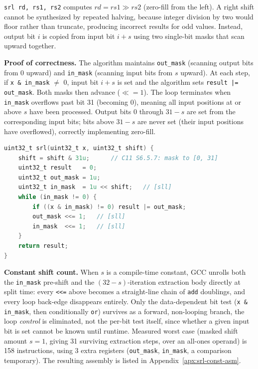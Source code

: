 \texttt{srl rd, rs1, rs2} computes $\mathit{rd} = \mathit{rs1} \gg \mathit{rs2}$ (zero-fill from
the left). A right shift cannot be synthesized by repeated halving, because integer division by two
would floor rather than truncate, producing incorrect results for odd values. Instead, output bit $i$
is copied from input bit $i + s$ using two single-bit masks that scan upward together.

\textbf{Proof of correctness.} The algorithm maintains \texttt{out\_mask} (scanning output bits from
0 upward) and \texttt{in\_mask} (scanning input bits from $s$ upward). At each step, if
\texttt{x \& in\_mask} $\neq$ 0, input bit $i+s$ is set and the algorithm sets
\texttt{result |= out\_mask}. Both masks then advance ($\ll\!\!= 1$). The loop terminates when
\texttt{in\_mask} overflows past bit 31 (becoming 0), meaning all input positions at or above $s$
have been processed. Output bits 0 through $31 - s$ are set from the corresponding input bits; bits
above $31 - s$ are never set (their input positions have overflowed), correctly implementing
zero-fill.

\begin{lstlisting}[language=C]
uint32_t srl(uint32_t x, uint32_t shift) {
    shift = shift & 31u;      // C11 S6.5.7: mask to [0, 31]
    uint32_t result   = 0;
    uint32_t out_mask = 1u;
    uint32_t in_mask  = 1u << shift;   // [sll]
    while (in_mask != 0) {
        if ((x & in_mask) != 0) result |= out_mask;
        out_mask <<= 1;   // [sll]
        in_mask  <<= 1;   // [sll]
    }
    return result;
}
\end{lstlisting}

\textbf{Constant shift count.} When $s$ is a compile-time constant, GCC unrolls both the
\texttt{in\_mask} pre-shift and the $(32-s)$-iteration extraction body directly at split time: every
\texttt{<<=} above becomes a straight-line chain of \texttt{add} doublings, and every loop back-edge
disappears entirely. Only the data-dependent bit test (\texttt{x \& in\_mask}, then conditionally
\texttt{or}) survives as a forward, non-looping branch, the loop \textit{control} is eliminated,
not the per-bit test itself, since whether a given input bit is set cannot be known until runtime.
Measured worst case (masked shift amount $s = 1$, giving 31 surviving extraction steps, over an
all-ones operand) is 158 instructions, using 3 extra registers (\texttt{out\_mask},
\texttt{in\_mask}, a comparison temporary). The resulting assembly is listed in
Appendix~\ref{apx:srl-const-asm}.

